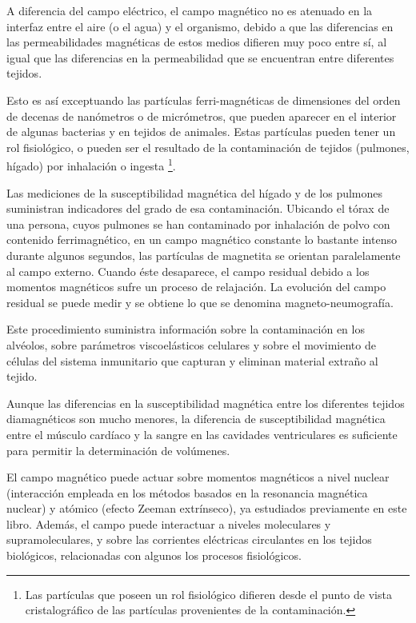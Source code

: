 A diferencia del campo eléctrico, el campo magnético no es atenuado en la interfaz entre el aire (o el agua) y el organismo, debido a que las diferencias en las permeabilidades magnéticas de estos medios difieren muy poco entre sí, al igual que las diferencias en la permeabilidad que se encuentran entre diferentes tejidos.

Esto es así exceptuando las partículas ferri-magnéticas de dimensiones del orden de decenas de nanómetros o de micrómetros, que pueden aparecer en el interior de algunas bacterias y en tejidos de animales. Estas partículas pueden tener un rol fisiológico, o pueden ser el resultado de la contaminación de tejidos (pulmones, hígado) por inhalación o ingesta \footnote{Las partículas que poseen un rol fisiológico difieren desde el punto de vista cristalográfico de las partículas provenientes de la contaminación.}. 

Las mediciones de la susceptibilidad magnética del hígado y de los pulmones suministran indicadores del grado de esa contaminación. Ubicando el tórax de una persona, cuyos pulmones se han contaminado por inhalación de polvo con contenido ferrimagnético, en un campo magnético constante lo bastante intenso durante algunos segundos, las partículas de magnetita se orientan paralelamente al campo externo. Cuando éste desaparece, el campo residual debido a los momentos magnéticos sufre un proceso de relajación. La evolución del campo residual se puede medir y se obtiene lo que se denomina magneto-neumografía.

Este procedimiento suministra información sobre la contaminación en los alvéolos, sobre parámetros viscoelásticos celulares y sobre el movimiento de células del sistema inmunitario que capturan y eliminan material extraño al tejido.

Aunque las diferencias en la susceptibilidad magnética entre los diferentes tejidos diamagnéticos son mucho menores, la diferencia de susceptibilidad magnética entre el músculo cardíaco y la sangre en las cavidades ventriculares es suficiente para permitir la determinación de volúmenes.

El campo magnético puede actuar sobre momentos magnéticos a nivel nuclear (interacción empleada en los métodos basados en la resonancia magnética nuclear) y atómico (efecto Zeeman extrínseco), ya estudiados previamente en este libro. Además, el campo puede interactuar a niveles moleculares y supramoleculares, y sobre las corrientes eléctricas circulantes en los tejidos biológicos, relacionadas con algunos los procesos fisiológicos.

